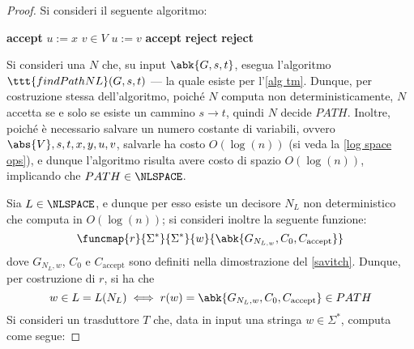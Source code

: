 \documentclass[a4paper, 12pt]{report}
\begin{document}
    \begin{proof}
        Si consideri il seguente algoritmo:

        \begin{algorithmic}[1]
                    \State \textbf{accept}
                \EndIf
                \State $u := x$
                \For{$\_ \in [1, \abs{V}]$} 
                    \State $v \in V$ 
                        \State $u := v$
                            \State \textbf{accept}
                        \EndIf
                    \Else
                        \State \textbf{reject} 
                    \EndIf
                \EndFor
                \State \textbf{reject} 
            \EndFunction
        \end{algorithmic}

        Si consideri una \NTM $N$ che, su input $\abk{G, s, t}$, esegua l'algoritmo $\ttt{findPathNL}(G, s, t)$ --- la quale esiste per l'\cref{alg tm}. Dunque, per costruzione stessa dell'algoritmo, poiché $N$ computa non deterministicamente, $N$ accetta se e solo se esiste un cammino $s \to t$, quindi $N$ decide $PATH$. Inoltre, poiché è necessario salvare un numero costante di variabili, ovvero $\abs{V}, s, t, x, y, u, v$, salvarle ha costo $O(\log(n))$ (si veda la \cref{log space ops}), e dunque l'algoritmo risulta avere costo di spazio $O(\log(n))$, implicando che $PATH \in \NLSPACE$.

        Sia $L \in \NLSPACE$, e dunque per esso esiste un decisore $N_L$ non deterministico che computa in $O(\log(n))$; si consideri inoltre la seguente funzione: $$\funcmap{r}{\Sigma^*}{\Sigma^*}{w}{\abk{G_{N_{L, w}}, C_0, C_\mathrm{accept}}}$$ dove $G_{N_L, w}$, $C_0$ e $C_\mathrm{accept}$ sono definiti nella dimostrazione del \cref{savitch}. Dunque, per costruzione di $r$, si ha che $$w \in L = L(N_L) \iff r(w) = \abk{G_{N_L, w}, C_0, C_\mathrm{accept}} \in PATH$$ Si consideri un trasduttore $T$ che, data in input una stringa $w \in \Sigma^*$, computa come segue:


\end{proof}
\end{document}
